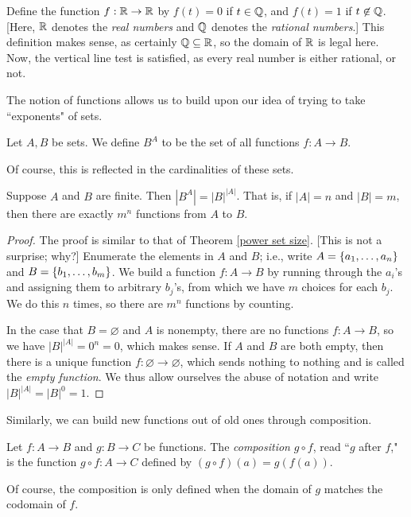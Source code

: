 \documentclass{article}
\begin{document}
\begin{example}
Define the function $f: \mathbb R\to \mathbb R$ by $f(t) = 0$ if $t\in \mathbb Q$, and $f(t) = 1$ if $t\not\in \mathbb Q$. [Here, $\mathbb R$ denotes the \textit{real numbers} and $\mathbb Q$ denotes the \textit{rational numbers}.] This definition makes sense, as certainly $\mathbb Q\subseteq \mathbb R$, so the domain of $\mathbb R$ is legal here. Now, the vertical line test is satisfied, as every real number is either rational, or not.
\end{example}

The notion of functions allows us to build upon our idea of trying to take ``exponents" of sets.
\begin{definition}
Let $A, B$ be sets. We define $B^A$ to be the set of all functions $f: A\to B$.
\end{definition}
Of course, this is reflected in the cardinalities of these sets.
\begin{theorem}
Suppose $A$ and $B$ are finite. Then $|B^A| = |B|^{|A|}$. That is, if $|A| = n$ and $|B| = m$, then there are exactly $m^n$ functions from $A$ to $B$.
\end{theorem}
\begin{proof}
The proof is similar to that of Theorem \ref{power set size}. [This is not a surprise; why?] Enumerate the elements in $A$ and $B$; i.e., write $A = \left\{a_1, \ldots, a_n\right\}$ and $B = \left\{b_1, \ldots, b_m\right\}$. We build a function $f: A\to B$ by running through the $a_i$'s and assigning them to arbitrary $b_j$'s, from which we have $m$ choices for each $b_j$. We do this $n$ times, so there are $m^n$ functions by counting.

In the case that $B = \varnothing$ and $A$ is nonempty, there are no functions $f: A\to B$, so we have $|B|^{|A|}= 0^n = 0$, which makes sense. If $A$ and $B$ are both empty, then there is a unique function $f: \varnothing \to \varnothing$, which sends nothing to nothing and is called the \textit{empty function}. We thus allow ourselves the abuse of notation and write $|B|^{|A|} = |B|^0 = 1$.
\end{proof}
Similarly, we can build new functions out of old ones through composition.
\begin{definition}
Let $f: A\to B$ and $g: B\to C$ be functions. The \textit{composition} $g\circ f$, read ``$g$ after $f$," is the function $g\circ f: A\to C$ defined by $(g \circ f)(a) = g(f(a))$.
\end{definition}
Of course, the composition is only defined when the domain of $g$ matches the codomain of $f$.
 
\end{document}
